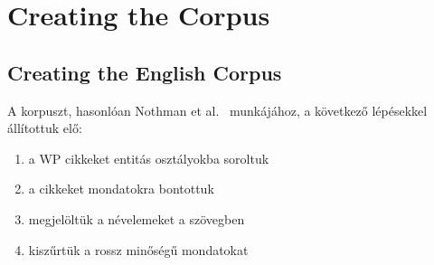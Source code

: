 \documentclass{llncs}
\begin{document}



\section{Creating the Corpus}
\subsection{Creating the English Corpus}

A korpuszt, hasonlóan Nothman et al.~\cite{Nothman:08} munkájához, a következő
lépésekkel állítottuk elő:
 
\begin{enumerate}
\item a WP cikkeket entitás osztályokba soroltuk
\item a cikkeket mondatokra bontottuk
\item megjelöltük a névelemeket a szövegben
\item kiszűrtük a rossz minőségű mondatokat
\end{enumerate}
\end{document}
